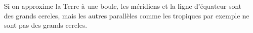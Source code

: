 
Si on approxime la Terre à une boule, les méridiens et la ligne d'équateur sont des grands cercles, mais les autres parallèles comme les tropiques par exemple ne sont pas des grands cercles.